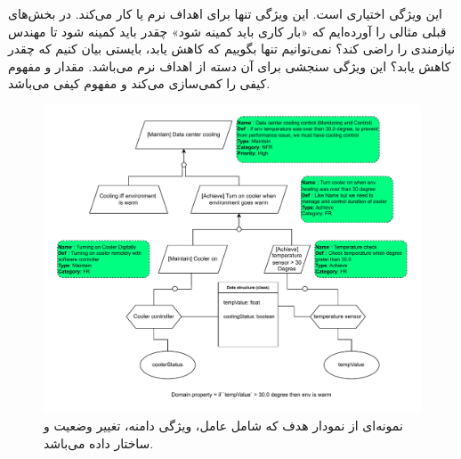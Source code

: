 این ویژگی اختیاری است. این ویژگی تنها برای اهداف نرم یا  کار
می‌کند. در بخش‌های قبلی مثالی را آورده‌ایم که «بار کاری باید کمینه شود» چقدر
باید کمینه شود تا مهندس نیازمندی را راضی کند؟ نمی‌توانیم تنها بگوییم که کاهش
یابد، بایستی بیان کنیم که چقدر کاهش یابد؟ این ویژگی سنجشی برای آن دسته از اهداف
نرم می‌باشد. مقدار و مفهوم کیفی را کمی‌سازی می‌کند و مفهوم کیفی 
می‌باشد.

\begin{figure}[H]
    \centering
    \includegraphics[width=1\textwidth]{assets/exp_1.drawio.pdf}
    \caption{نمونه‌ای از نمودار هدف که شامل عامل، ویژگی دامنه، تغییر وضعیت و
    ساختار داده می‌باشد.}
\end{figure}
